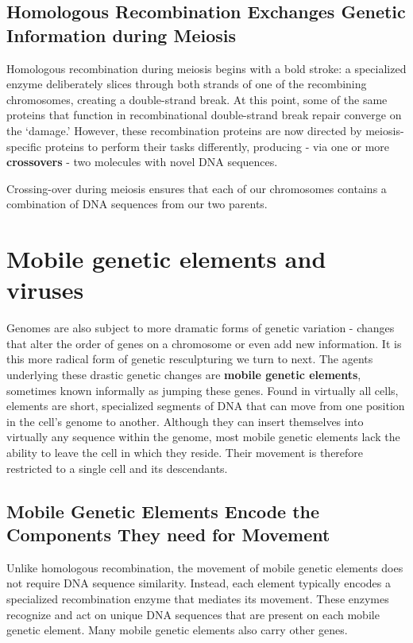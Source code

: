 \subsection{Homologous Recombination Exchanges Genetic Information during Meiosis}

Homologous recombination during meiosis begins with a bold stroke:
a specialized enzyme deliberately slices through both strands of one
of the recombining chromosomes, creating a double-strand break. At
this point, some of the same proteins that function in recombinational
double-strand break repair converge on the ‘damage.’ However, these
recombination proteins are now directed by meiosis-specific proteins to
perform their tasks differently, producing - via one or more \textbf{crossovers} -
two molecules with novel DNA sequences.

Crossing-over during meiosis ensures that each of our chromosomes
contains a combination of DNA sequences from our two parents.

\section{Mobile genetic elements and viruses}

Genomes are also subject to more dramatic forms of genetic variation
- changes that alter the order of genes on a chromosome or even
add new information. It is this more radical form of genetic resculpturing
we turn to next. The agents underlying these drastic genetic changes
are \textbf{mobile genetic elements}, sometimes known informally as jumping these
genes. Found in virtually all cells,
elements are short, specialized
segments of DNA that can move from one position in the cell’s genome to
another. Although they can insert themselves into virtually any sequence
within the genome, most mobile genetic elements lack the ability to leave
the cell in which they reside. Their movement is therefore restricted to a
single cell and its descendants.

\subsection{Mobile Genetic Elements Encode the Components They need for Movement}

Unlike homologous recombination, the movement of mobile genetic elements
does not require DNA sequence similarity. Instead, each element
typically encodes a specialized recombination enzyme that mediates its
movement. These enzymes recognize and act on unique
DNA sequences that are present on each mobile genetic element. Many
mobile genetic elements also carry other genes.

